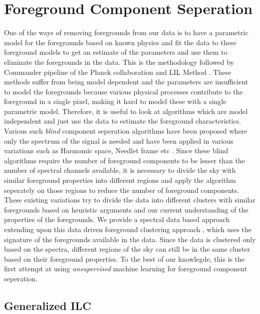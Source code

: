 \chapter{Foreground Component Seperation}
One of the ways of removing foregrounds from our data is to have a parametric model for the
foregrounds based on known physics and fit the data to these foreground models to get an
estimate of the parameters and use them to eliminate the foregrounds in the data. This is
the methodology followed by Commander pipeline of the Planck collaboration \cite{cmbpara} and LIL Method
\cite{lilrishi}. These methods suffer from being model dependent and the parameters are
insufficient to model the foregrounds because various physical processes
contribute to the foreground in a single pixel, making it hard to model these with a single
parametric model. Therefore, it is useful to look at
algorithms which are model independent and just use the data to estimate the foreground
characteristics.\\
Various such \emph{blind} component seperation algorithms have been proposed where
only the spectrum of the signal is needed \cite{ilc,gilc} and have been applied in various
variations such as Harmomic space, Needlet frame etc \cite{harmonicilc, needlet}. Since these
blind algorithms require the number of foreground components to be lesser than the
number of spectral channels available, it is necessary to divide the sky with similar foreground
properties into different regions and apply the algorithm seperately on those regions to reduce
the number of foreground components. These existing variations try to divide the data into
different clusters with similar foregrounds based on heuristic arguments and
our current understanding of the
properties of the foregrounds. We provide a spectral data based
approach extending upon this data driven foreground clustering approach \cite{datarishi}, which
uses the signature of the foregrounds available in the data.
Since the data is clustered only based on the spectra, different regions of the sky can still be
in the same cluster based on their foreground properties. To the best of our
knowlegde, this is the first attempt at using \emph{unsupervised} machine learning for foreground
component seperation.

\section{Generalized ILC}

